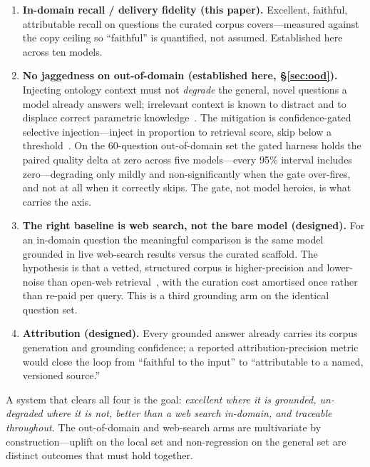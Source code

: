 \documentclass[11pt]{article}
\begin{document}
\begin{enumerate}[topsep=2pt,itemsep=2pt,leftmargin=1.4em]
\item \textbf{In-domain recall / delivery fidelity (this paper).} Excellent, faithful,
attributable recall on questions the curated corpus covers---measured against the copy ceiling so
``faithful'' is quantified, not assumed. Established here across ten models.
\item \textbf{No jaggedness on out-of-domain (established here, \S\ref{sec:ood}).} Injecting
ontology context must not \emph{degrade} the general, novel questions a model already answers well;
irrelevant context is known to distract and to displace correct parametric
knowledge~\cite{shi2023distracted,yoran2024robust,longpre2021entity}. The mitigation is
confidence-gated selective injection---inject in proportion to retrieval score, skip below a
threshold~\cite{mallen2023trust}. On the 60-question out-of-domain set the gated harness holds the
paired quality delta at zero across five models---every 95\% interval includes zero---degrading
only mildly and non-significantly when the gate over-fires, and not at all when it correctly skips.
The gate, not model heroics, is what carries the axis.
\item \textbf{The right baseline is web search, not the bare model (designed).} For an in-domain
question the meaningful comparison is the same model grounded in live web-search results versus
the curated scaffold. The hypothesis is that a vetted, structured corpus is higher-precision and
lower-noise than open-web retrieval~\cite{shi2023distracted}, with the curation cost amortised
once rather than re-paid per query. This is a third grounding arm on the identical question set.
\item \textbf{Attribution (designed).} Every grounded answer already carries its corpus
generation and grounding confidence; a reported attribution-precision metric would close the
loop from ``faithful to the input'' to ``attributable to a named, versioned source.''
\end{enumerate}

\noindent A system that clears all four is the goal: \emph{excellent where it is grounded,
un-degraded where it is not, better than a web search in-domain, and traceable throughout.} The
out-of-domain and web-search arms are multivariate by construction---uplift on the local set and
non-regression on the general set are distinct outcomes that must hold together.

\end{document}
